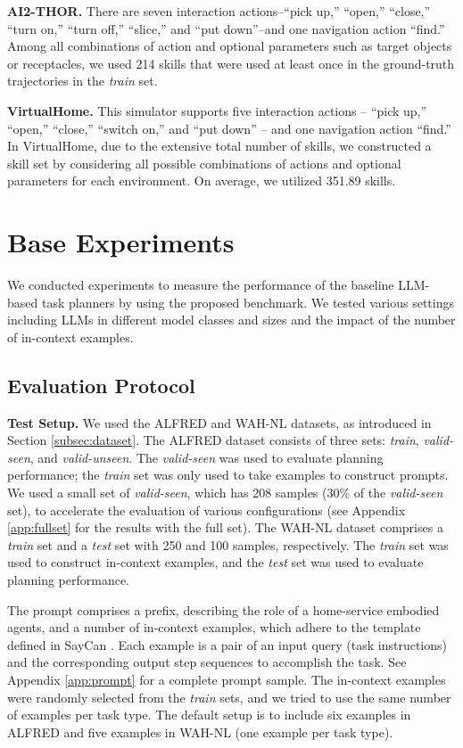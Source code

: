 \textbf{AI2-THOR.} There are seven interaction actions--``pick up,'' ``open,'' ``close,'' ``turn on,'' ``turn off,'' ``slice,'' and ``put down''--and one navigation action ``find.'' Among all combinations of action and optional parameters such as target objects or receptacles, we used 214 skills that were used at least once in the ground-truth trajectories in the \textit{train} set.

\textbf{VirtualHome.} This simulator supports five interaction actions -- ``pick up,'' ``open,'' ``close,'' ``switch on,'' and ``put down'' -- and one navigation action ``find.''  In VirtualHome, due to the extensive total number of skills, we constructed a skill set by considering all possible combinations of actions and optional parameters for each environment. On average, we utilized 351.89 skills.

\section{Base Experiments}  %
\label{sec:base_experiments}

We conducted experiments to measure the performance of the baseline LLM-based task planners by using the proposed benchmark. We tested various settings including LLMs in different model classes and sizes and the impact of the number of in-context examples.

\subsection{Evaluation Protocol}
\label{subsec:evaluation_protocol}

\textbf{Test Setup.} We used the ALFRED and WAH-NL datasets, as introduced in Section \ref{subsec:dataset}. The ALFRED dataset consists of three sets: \textit{train}, \textit{valid-seen}, and \textit{valid-unseen}. The \textit{valid-seen} was used to evaluate planning performance; the \textit{train} set was only used to take examples to construct prompts. We used a small set of \textit{valid-seen}, which has 208 samples (30\% of the \textit{valid-seen} set), to accelerate the evaluation of various configurations (see Appendix \ref{app:fullset} for the results with the full set). The WAH-NL dataset comprises a \textit{train} set and a \textit{test} set with 250 and 100 samples, respectively. The \textit{train} set was used to construct in-context examples, and the \textit{test} set was used to evaluate planning performance.

The prompt comprises a prefix, describing the role of a home-service embodied agents, and a number of in-context examples, which adhere to the template defined in SayCan \citep{ahn2023do}. Each example is a pair of an input query (task instructions) and the corresponding output step sequences to accomplish the task. See Appendix \ref{app:prompt} for a complete prompt sample. The in-context examples were randomly selected from the \textit{train} sets, and we tried to use the same number of examples per task type. The default setup is to include six examples in ALFRED and five examples in WAH-NL (one example per task type). 

